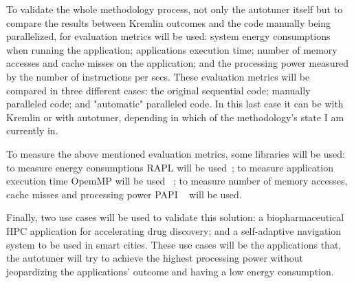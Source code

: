 To validate the whole methodology process, not only the autotuner itself but to compare the results between Kremlin outcomes and the code manually being parallelized, for evaluation metrics will be used: system energy consumptions when running the application; applications execution time; number of memory accesses and cache misses on the application; and the processing power measured by the number of instructions per secs. These evaluation metrics will be compared in three different cases: the original sequential code; manually paralleled code; and "automatic" paralleled code. In this last case it can be with Kremlin or with autotuner, depending in which of the methodology's state I am currently in.

To measure the above mentioned evaluation metrics, some libraries will be used: to measure energy consumptions RAPL will be used~\cite{Marcus}; to measure application  execution time OpemMP will be used ~\cite{Nc1998}; to measure number of memory accesses, cache misses and processing power PAPI ~\cite{Marcus} will be used.

Finally, two use cases will be used to validate this solution: a biopharmaceutical HPC application for accelerating drug discovery; and a self-adaptive navigation system to be used in smart cities. These use cases will be the applications that, the autotuner will try to achieve the highest processing power without jeopardizing the applications' outcome and having a low energy consumption.
